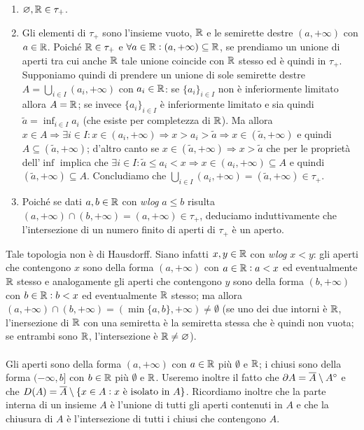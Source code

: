 \documentclass[a4paper]{article}\par \usepackage{style}\par
\begin{document}
\begin{enumerate}[label = (\roman*)]
\item $ \varnothing, \mathbb{R} \in \tau_+ $.
\item Gli elementi di $ \tau_+ $ sono l'insieme vuoto, $ \mathbb{R} $ e le semirette destre $ (a, +\infty) $ con $ a \in \mathbb{R} $. Poiché $ \mathbb{R} \in \tau_+ $ e $ \forall a \in \mathbb{R} : (a, +\infty) \subseteq \mathbb{R} $, se prendiamo un unione di aperti tra cui anche $ \mathbb{R} $ tale unione coincide con $ \mathbb{R} $ stesso ed è quindi in $ \tau_+ $. Supponiamo quindi di prendere un unione di sole semirette destre $ A = \bigcup_{i \in I} (a_i, +\infty) $ con $ a_i \in \mathbb{R} $: se $ \{a_i\}_{i \in I} $ non è inferiormente limitato allora $ A = \mathbb{R} $; se invece $ \{a_i\}_{i \in I} $ è inferiormente limitato e sia quindi $ \tilde{a} = \inf_{i \in I} a_i $ (che esiste per completezza di $ \mathbb{R} $). Ma allora $ x \in A \Rightarrow \exists i \in I : x \in (a_i, +\infty) \Rightarrow x > a_i > \tilde{a} \Rightarrow x \in (\tilde{a}, +\infty) $ e quindi $ A \subseteq (\tilde{a}, +\infty) $; d'altro canto se $ x \in (\tilde{a}, +\infty) \Rightarrow x > \tilde{a} $ che per le proprietà dell'$ \inf $ implica che $ \exists i \in I : \tilde{a} \leq a_i < x \Rightarrow x \in (a_i, +\infty) \subseteq A $ e quindi $ (\tilde{a}, +\infty) \subseteq A $. Concludiamo che $ \bigcup_{i \in I} (a_i, +\infty) = (\tilde{a}, +\infty) \in \tau_+ $.
\item Poiché se dati $ a, b \in \mathbb{R} $ con \emph{wlog} $ a \leq b $ risulta $ (a, +\infty) \cap (b, +\infty) = (a, +\infty) \in \tau_+ $, deduciamo induttivamente che l'intersezione di un numero finito di aperti di $ \tau_+ $ è un aperto.
\end{enumerate}
Tale topologia non è di Hausdorff. Siano infatti $ x, y \in \mathbb{R} $ con \emph{wlog} $ x < y $: gli aperti che contengono $ x $ sono della forma $ (a, +\infty) $ con $ a \in \mathbb{R} : a < x $ ed eventualmente $ \mathbb{R} $ stesso e analogamente gli aperti che contengono $ y $ sono della forma $ (b, +\infty) $ con $ b \in \mathbb{R} : b < x $ ed eventualmente $ \mathbb{R} $ stesso; ma allora $ (a, +\infty) \cap (b, +\infty) = (\min\{a, b\}, +\infty) \neq \emptyset $ (se uno dei due intorni è $ \mathbb{R} $, l'inersezione di $ \mathbb{R} $ con una semiretta è la semiretta stessa che è quindi non vuota; se entrambi sono $ \mathbb{R} $, l'intersezione è $ \mathbb{R} \neq \varnothing $). \\
\\
Gli aperti sono della forma $ (a, +\infty) $ con $ a \in \mathbb{R} $ più $ \emptyset $ e $ \mathbb{R} $; i chiusi sono della forma $ (-\infty, b] $ con $ b \in \mathbb{R} $ più $ \emptyset $ e $ \mathbb{R} $. Useremo inoltre il fatto che $ \partial{A} = \overline{A} \setminus {A}^{\circ} $ e che $ D{(A)} = \overline{A} \setminus \{x \in A : x \text{ è isolato in } A\} $. Ricordiamo inoltre che la parte interna di un insieme $ A $ è l'unione di tutti gli aperti contenuti in $ A $ e che la chiusura di $ A $ è l'intersezione di tutti i chiusi che contengono $ A $.\\
\end{document}
